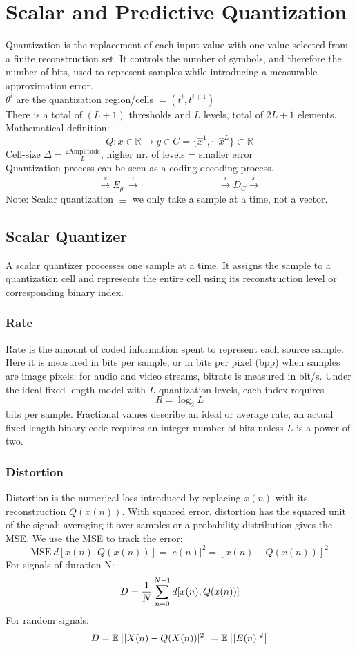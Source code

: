 \section{Scalar and Predictive Quantization}
Quantization is the replacement of each input value with one value selected from a finite reconstruction set. It controls the number of symbols, and therefore the number of bits, used to represent samples while introducing a measurable approximation error.\\
$\theta^i$ are the quantization region/cells $ = (t^i, t^{i+1})$\\
There is a total of $(L+1)$ thresholds and $L$ levels, total of $2L+1$ elements.
Mathematical definition:
$$Q : x\in \mathbb{R} \to y \in C = \{\hat{x}^1, \cdots \hat{x}^L\} \subset \mathbb{R}$$
Cell-size $\Delta = \frac{2\text{Amplitude}}{L}$, higher nr. of levels = smaller error\\
Quantization process can be seen as a coding-decoding process.
$$\stackrel{x}{\longrightarrow}\boxed{E_{\theta^i}}\stackrel{i}{\longrightarrow}\qquad \qquad \qquad \qquad \stackrel{i}{\longrightarrow}\boxed{D_{C}}\stackrel{\hat{x}}{\longrightarrow}$$
Note: Scalar quantization $\equiv$ we only take a sample at a time, not a vector.
\subsection{Scalar Quantizer}
A scalar quantizer processes one sample at a time. It assigns the sample to a quantization cell and represents the entire cell using its reconstruction level or corresponding binary index.
\subsubsection{Rate}
Rate is the amount of coded information spent to represent each source sample. Here it is measured in bits per sample, or in bits per pixel (bpp) when samples are image pixels; for audio and video streams, bitrate is measured in bit/s.
Under the ideal fixed-length model with $L$ quantization levels, each index requires
$$R = \log_2 L$$
bits per sample. Fractional values describe an ideal or average rate; an actual fixed-length binary code requires an integer number of bits unless $L$ is a power of two.
\subsubsection{Distortion}
Distortion is the numerical loss introduced by replacing $x(n)$ with its reconstruction $Q(x(n))$. With squared error, distortion has the squared unit of the signal; averaging it over samples or a probability distribution gives the MSE.
We use the MSE to track the error:
$$\text{MSE}\ d[x(n),Q(x(n))] =|e(n)|^2 = \left[x(n)-Q(x(n))\right]^2$$
For signals of duration N:
$$ D = \frac{1}{N}\sr{N-1}{n=0}d[x(n),Q(x(n))]$$
For random signals:
$$D = \vatt{|X(n) - Q(X(n))|^2} = \vatt{|E(n)|^2}$$
